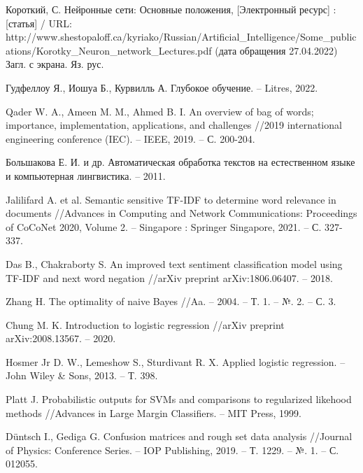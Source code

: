\documentclass[bachelor, och, coursework]{SCWorks}
\begin{document}
\begin{thebibliography}{99}
     Короткий, С. Нейронные сети: Основные положения, [Электронный
    ресурс] : [статья] / URL:
    http://www.shestopaloff.ca/kyriako/Russian/Artificial_Intelligence/Some_publications/Korotky_Neuron_network_Lectures.pdf
    (дата обращения 27.04.2022) Загл. с экрана. Яз. рус.
    
     Гудфеллоу Я., Иошуа Б., Курвилль А. Глубокое обучение. –
    Litres, 2022.
    
     Qader W. A., Ameen M. M., Ahmed B. I. An overview of bag of
    words; importance, implementation, applications, and challenges //2019
    international engineering conference (IEC). – IEEE, 2019. – С. 200-204.


     Большакова Е. И. и др. Автоматическая обработка текстов на
    естественном языке и компьютерная лингвистика. – 2011.

     Jalilifard A. et al. Semantic sensitive TF-IDF to determine
    word relevance in documents //Advances in Computing and Network
    Communications: Proceedings of CoCoNet 2020, Volume 2. – Singapore :
    Springer Singapore, 2021. – С. 327-337.

     Das B., Chakraborty S. An improved text sentiment
    classification model using TF-IDF and next word negation //arXiv preprint
    arXiv:1806.06407. – 2018.

     Zhang H. The optimality of naive Bayes //Aa. – 2004. – Т. 1. –
    №. 2. – С. 3.

     Chung M. K. Introduction to logistic regression //arXiv
    preprint arXiv:2008.13567. – 2020.

     Hosmer Jr D. W., Lemeshow S., Sturdivant R. X. Applied
    logistic regression. – John Wiley \& Sons, 2013. – Т. 398.


     Platt J. Probabilistic outputs for SVMs and comparisons to
    regularized likehood methods //Advances in Large Margin Classifiers. – MIT
    Press, 1999.

     Düntsch I., Gediga G. Confusion matrices and rough set data
    analysis //Journal of Physics: Conference Series. – IOP Publishing, 2019. –
    Т. 1229. – №. 1. – С. 012055.


\end{thebibliography}
\end{document}
